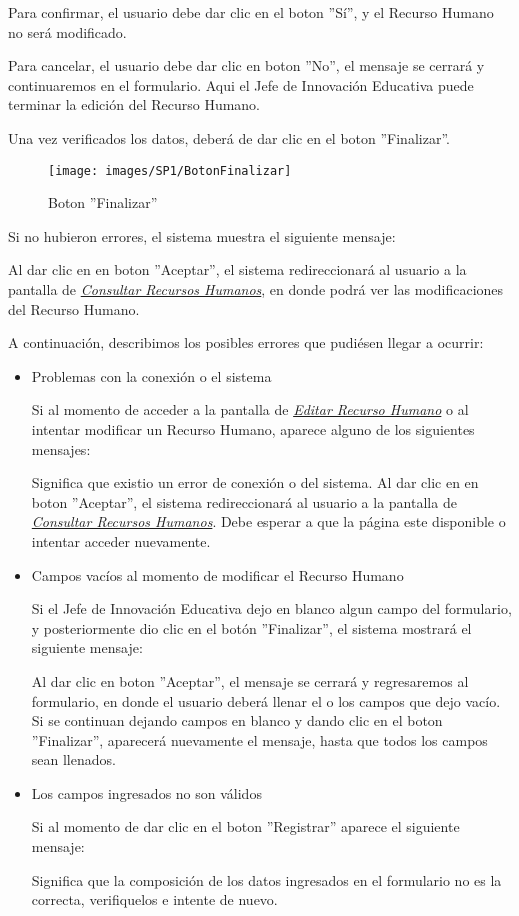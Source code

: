 Para confirmar, el usuario debe dar clic en el boton ''Sí'', y el Recurso Humano no será modificado.

Para cancelar, el usuario debe dar clic en boton ''No'', el mensaje se cerrará y continuaremos en el formulario. Aqui el Jefe de Innovación Educativa puede terminar la edición del Recurso Humano.

Una vez verificados los datos, deberá de dar clic en el boton ''Finalizar''.
\begin{figure}[!hbtp]
	\centering
	\hypertarget{btnfin}{\texttt{[image: images/SP1/BotonFinalizar]}}
	\caption{Boton ''Finalizar''}
	\label{btnfin}
\end{figure}

Si no hubieron errores, el sistema muestra el siguiente mensaje:

Al dar clic en en boton ''Aceptar'', el sistema redireccionará al usuario a la pantalla de \hyperlink{consultarrh}{\textit{Consultar Recursos Humanos}}, en donde podrá ver las modificaciones del Recurso Humano.

A continuación, describimos los posibles errores que pudiésen llegar a ocurrir:

\begin{itemize}
	\item Problemas con la conexión o el sistema

	Si al momento de acceder a la pantalla de \hyperlink{editarrh}{\textit{Editar Recurso Humano}} o al intentar modificar un Recurso Humano, aparece alguno de los siguientes mensajes:

	Significa que existio un error de conexión o del sistema. Al dar clic en en boton ''Aceptar'', el sistema redireccionará al usuario a la pantalla de \hyperlink{consultarrh}{\textit{Consultar Recursos Humanos}}. Debe esperar a que la página este disponible o intentar acceder nuevamente.

	\item Campos vacíos al momento de modificar el Recurso Humano

	Si el Jefe de Innovación Educativa dejo en blanco algun campo del formulario, y posteriormente dio clic en el botón ''Finalizar'', el sistema mostrará el siguiente mensaje:

	Al dar clic en boton ''Aceptar'', el mensaje se cerrará y regresaremos al formulario, en donde el usuario deberá llenar el o los campos que dejo vacío. Si se continuan dejando campos en blanco y dando clic en el boton ''Finalizar'', aparecerá nuevamente el mensaje, hasta que todos los campos sean llenados.

	\item Los campos ingresados no son válidos

	Si al momento de dar clic en el boton ''Registrar'' aparece el siguiente mensaje:

	Significa que la composición de los datos ingresados en el formulario no es la correcta, verifiquelos e intente de nuevo.

\end{itemize}
